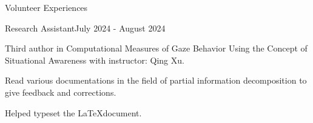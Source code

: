 \documentclass[
	11pt, %
]{resume} %
\begin{document}
\begin{rSection}{Volunteer Experiences}
	\begin{rSubsection}{Research Assistant}{July 2024 - August 2024}{}{}
		\item Third author in Computational Measures of Gaze Behavior Using the Concept of Situational Awareness with instructor: Qing Xu.
		\item Read various documentations in the field of partial information decomposition to give feedback and corrections.
		\item Helped typeset the \LaTeX document.
	\end{rSubsection}
	
\end{rSection}



		
	
		
\end{document}
